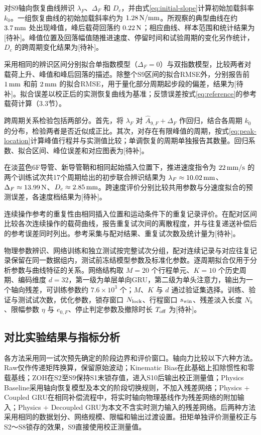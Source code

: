 \documentclass{JQR_LaTeX_Template-0507/JQRnew}
\providecommand{\RevisionColor}{\color{black}}
\newcommand{\revbegin}{\begingroup\RevisionColor}
\newcommand{\revend}{\par\endgroup}
\begin{document}
\revbegin
对S9轴向恢复曲线辨识 $\lambda_F$、$\Delta_F$ 和 $D_c$，并由式\eqref{eq:initial-slope}计算初始加载斜率 $k_0$。一组恢复曲线的初始加载斜率约为 $1.28\,{\rm N/mm}$。所观察的典型曲线在约 $3.7\,{\rm mm}$ 处出现峰值，峰后载荷回落约 $0.22\,{\rm N}$；相应曲线、样本范围和统计结果为[待补]。峰值位置及回落幅值随推进速度、停留时间和试验周期的变化另作统计，$D_c$ 的跨周期变化结果为[待补]。
\revend

采用相同的辨识区间分别拟合单指数模型（$\Delta_F=0$）与双指数模型，比较两者对载荷上升、峰值和峰后回落的描述。除整个S9区间的拟合RMSE外，分别报告前 $1\,{\rm mm}$ 和前 $2\,{\rm mm}$ 的拟合RMSE，用于量化部分周期起步段的偏差，结果为[待补]。拟合误差以校正后的实测恢复曲线为基准；反馈误差按式\eqref{eq:reference}的参考载荷计算（3.3节）。

\revbegin
跨周期关系检验包括两部分。首先，将 $\lambda_F$ 对 $\widehat A_{9,F}+\Delta_F$ 作回归，结合各周期 $k_0$ 的分布，检验两者是否近似成正比。其次，对存在有限峰值的周期，按式\eqref{eq:peak-location}计算峰值行程并与实测值比较；单调恢复的周期单独报告其数量。回归系数、拟合区间、峰位误差和对应图表为[待补]。
\revend

在淡蓝色6F导管、新导管鞘和相同起始插入位置下，推进速度指令为 $22\,{\rm mm/s}$ 的两个训练试次共17个周期给出的初步联合辨识结果为 $\lambda_F\approx10.02\,{\rm mm}$、$\Delta_F\approx13.99\,{\rm N}$、$D_c\approx2.85\,{\rm mm}$。跨速度评价分别比较共用参数与分速度拟合的预测误差，各速度档结果为[待补]。

连续操作参考的重复性由相同插入位置和运动条件下的重复记录评价。在配对区间比较各次连续操作的载荷曲线，报告重复试次间的离散程度，并与往复递送补偿后的参考误差同时列出。参考采集与配对结果、重复试次数及统计量为[待补]。

物理参数辨识、网络训练和独立测试按完整试次分组，配对连续记录与对应往复记录保留在同一数据组内，测试前冻结模型参数及标准化参数。逐周期拟合仅用于分析参数与曲线特征的关系。网络结构取 $M=20$ 个行程单元、$K=10$ 个历史周期、编码维度 $d=32$，第一级为单层单向GRU，第二级为单头注意力，输出为一个轴向残差，可训练参数约 $7.6\times10^3$ 个；$M$、$K$ 与 $d$ 通过验证集选择。训练、验证与测试试次数，优化参数，锁存窗口 $N_{\rm lock}$、行程窗口 $s_{\rm win}$、残差淡入长度 $N_b$、限幅参数 $\eta$ 与 $e_{0,F}$、停止判定参数及撤除时长 $T_{\rm off}$ 为[待补]。

\subsection{对比实验结果与指标分析}

各方法采用同一试次预先确定的阶段边界和评价窗口。轴向力比较以下六种方法。Raw仅作传递矩阵换算，保留原始波动；Kinematic Bias在此基础上扣除惯性和零载基线；ZOH在S2至S9保持S1末锁存值，进入S10后输出校正测量值；Physics Baseline采用轴向恢复模型及本文的阶段切换规则，不加入残差网络；Physics + Coupled GRU在相同补偿流程中，将实时轴向物理基线作为残差网络的附加输入；Physics + Decoupled GRU为本文不含实时测力输入的残差网络。后两种方法采用相同的数据划分、网络规模、限幅和输出过渡设置。扭矩单独评价测量校正与S2～S8锁存的效果，S9直接使用校正测量值。
\end{document}
